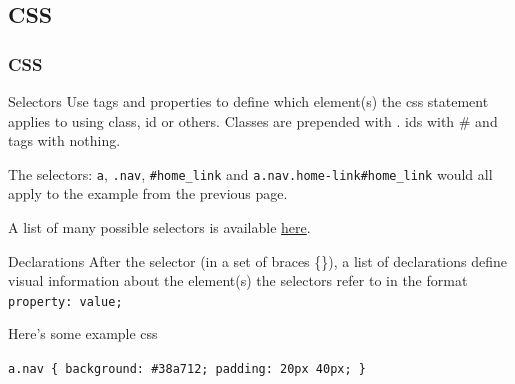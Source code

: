\documentclass{beamer}
\begin{document}
\subsection{CSS}

\begin{frame}
\frametitle{CSS}

\begin{block}{Selectors}
Use tags and properties to define which element(s) the css statement applies to using class, id or others. Classes are prepended with . ids with \# and tags with nothing.

The selectors: \texttt{a}, \texttt{.nav}, \texttt{\#home\_link} and \texttt{a.nav.home-link\#home\_link} would all apply to the example from the previous page.

A list of many possible selectors is available \href{http://en.wikipedia.org/wiki/Cascading_Style_Sheets\#cite_ref-6}{here}.
\end{block}

\begin{block}{Declarations}
After the selector (in a set of braces \{\}), a list of declarations define visual information about the element(s) the selectors refer to in the format \texttt{property: value;}
\end{block}

Here's some example css

\texttt{a.nav \{ background: \#38a712; padding: 20px 40px; \}}

\end{frame}

\end{document}
